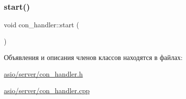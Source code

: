 \mbox{\label{classcon__handler_a02d6691e226a75525a2ac83062b5c7f7}} 
\subsubsection{\texorpdfstring{start()}{start()}\hspace{0.1cm}{\footnotesize\ttfamily [2/2]}}
{\footnotesize\ttfamily void con\+\_\+handler\+::start (\begin{DoxyParamCaption}{ }\end{DoxyParamCaption})}



Объявления и описания членов классов находятся в файлах\+:\begin{DoxyCompactItemize}
\item 
\mbox{\hyperlink{asio_2server_2con__handler_8h}{asio/server/con\+\_\+handler.\+h}}\item 
\mbox{\hyperlink{asio_2server_2con__handler_8cpp}{asio/server/con\+\_\+handler.\+cpp}}\end{DoxyCompactItemize}
